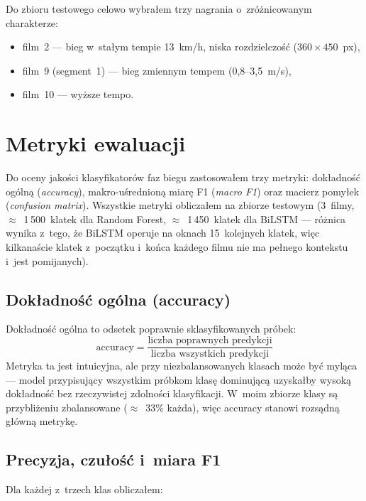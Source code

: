 Do zbioru testowego celowo wybrałem trzy nagrania o~zróżnicowanym charakterze:
\begin{itemize}
    \item film~2 --- bieg w~stałym tempie 13~km/h, niska rozdzielczość ($360 \times 450$~px),
    \item film~9 (segment~1) --- bieg zmiennym tempem (0{,}8--3{,}5~m/s),
    \item film~10 --- wyższe tempo.
\end{itemize}

\section{Metryki ewaluacji}
\label{sec:metryki}

Do oceny jakości klasyfikatorów faz biegu zastosowałem trzy metryki: dokładność ogólną (\textit{accuracy}), makro-uśrednioną miarę F1 (\textit{macro F1}) oraz macierz pomyłek (\textit{confusion matrix}). Wszystkie metryki obliczałem na zbiorze testowym (3~filmy, $\approx$~1\,500~klatek dla Random Forest, $\approx$~1\,450~klatek dla BiLSTM --- różnica wynika z~tego, że BiLSTM operuje na oknach 15~kolejnych klatek, więc kilkanaście klatek z~początku i~końca każdego filmu nie ma pełnego kontekstu i~jest pomijanych).

\subsection{Dokładność ogólna (accuracy)}
\label{sec:metryki-accuracy}

Dokładność ogólna to odsetek poprawnie sklasyfikowanych próbek:
\[
\text{accuracy} = \frac{\text{liczba poprawnych predykcji}}{\text{liczba wszystkich predykcji}}
\]
Metryka ta jest intuicyjna, ale przy niezbalansowanych klasach może być myląca --- model przypisujący wszystkim próbkom klasę dominującą uzyskałby wysoką dokładność bez rzeczywistej zdolności klasyfikacji. W~moim zbiorze klasy są przybliżeniu zbalansowane ($\approx$~33\% każda), więc accuracy stanowi rozsądną główną metrykę.

\subsection{Precyzja, czułość i~miara F1}
\label{sec:metryki-f1}

Dla każdej z~trzech klas obliczałem:

